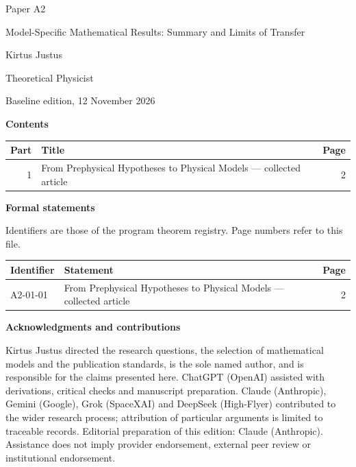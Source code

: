 \documentclass[11pt,a4paper]{article}
\begin{document}
\thispagestyle{empty}\pagestyle{empty}
{\small\sffamily \ProgramTitle\hfill Paper A2\par}
\vspace*{12mm}
{\LARGE\bfseries\raggedright{} Model-Specific Mathematical Results: Summary and Limits of Transfer\par}
\vspace{9mm}
{\large Kirtus Justus\par}\vspace{1mm}Theoretical Physicist\par\AuthorLocation\par\vspace{2mm}Baseline edition, 12 November 2026\par\vspace{8mm}
\textbf{Contents}\par\vspace{1mm}
{\small\begin{longtable}{@{}r>{\raggedright\arraybackslash}p{}r@{}}
\toprule Part & Title & Page\\\midrule\endhead
1 & From Prephysical Hypotheses to Physical Models — collected article & 2\\
\bottomrule\end{longtable}}
\vspace{2mm}\textbf{Formal statements}\par\vspace{1mm}
{\footnotesize Identifiers are those of the program theorem registry. Page numbers refer to this file.\par}
{\footnotesize\begin{longtable}{@{}l>{\raggedright\arraybackslash}p{}r@{}}
\toprule Identifier & Statement & Page\\\midrule\endhead
A2-01-01 & From Prephysical Hypotheses to Physical Models — collected article & 2\\
\bottomrule\end{longtable}}
\vspace{3mm}\textbf{Acknowledgments and contributions}\par
{\small Kirtus Justus directed the research questions, the selection of mathematical models and the publication standards, is the sole named author, and is responsible for the claims presented here. ChatGPT (OpenAI) assisted with derivations, critical checks and manuscript preparation. Claude (Anthropic), Gemini (Google), Grok (SpaceXAI) and DeepSeek (High-Flyer) contributed to the wider research process; attribution of particular arguments is limited to traceable records. Editorial preparation of this edition: Claude (Anthropic). Assistance does not imply provider endorsement, external peer review or institutional endorsement.\par}
\end{document}
